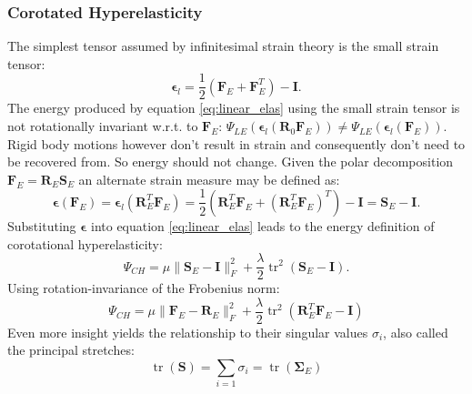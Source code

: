 \documentclass[m,times]{cgMA}
\begin{document}
\subsubsection{Corotated Hyperelasticity}\label{sec:cor_hyper}
The simplest tensor assumed by infinitesimal strain theory is the small strain tensor: \begin{equation}
  \boldsymbol{\epsilon}_l = \frac { 1 } { 2 } \left( \boldsymbol { F }_E + \boldsymbol { F }_E ^ { T } \right) - \boldsymbol { I }.
\end{equation}
The energy produced by equation \ref{eq:linear_elas} using the small strain tensor is not rotationally invariant w.r.t. to $\boldsymbol{F}_E$: $\Psi_{LE}(\boldsymbol{\epsilon}_l(\boldsymbol{R}_{0} \boldsymbol{F}_E)) \neq \Psi_{LE}(\boldsymbol{\epsilon}_l(\boldsymbol{F}_E))$. Rigid body motions however don't result in strain and consequently don't need to be recovered from. So energy should not change. Given the polar decomposition $\boldsymbol{F}_E = \boldsymbol{R}_E\boldsymbol{S}_E$ an alternate strain measure may be defined as:
\begin{equation}
 \boldsymbol { \epsilon } \left( \boldsymbol { F }_E \right) = \boldsymbol { \epsilon }_l \left( \boldsymbol { R }_E ^ { T } \boldsymbol { F }_E \right) = \frac { 1 } { 2 } \left( \boldsymbol { R }_E ^ { T } \boldsymbol { F }_E + \left( \boldsymbol { R }_E ^ { T } \boldsymbol { F }_E \right) ^ { T } \right) - \boldsymbol { I } = \boldsymbol { S }_E - \boldsymbol { I }.
\end{equation}
Substituting $ {\boldsymbol{\epsilon}}$ into equation \ref{eq:linear_elas} leads to the energy definition of corotational hyperelasticity:
\begin{equation}\label{eq:corot_S}
  \Psi_{CH} = \mu \| \boldsymbol{ S }_E - \boldsymbol { I } \| _ { F } ^ { 2 } + \frac { \lambda } { 2 } \operatorname { tr } ^ { 2 } ( \boldsymbol { S }_E - \boldsymbol { I } ).
\end{equation}
Using rotation-invariance of the Frobenius norm:
\begin{equation}
  \Psi_{CH} = \mu \| \boldsymbol {F}_E  - \boldsymbol {R}_E \| _ { F } ^ { 2 } + \frac { \lambda } { 2 } \operatorname { tr } ^ { 2 } \left( \boldsymbol { R }_E ^ { T } \boldsymbol { F }_E - \boldsymbol { I } \right)
\end{equation}
Even more insight yields the relationship to their singular values $\sigma _ i$, also called the principal stretches:
$$\operatorname {tr}\left(\boldsymbol{S}\right) = \sum _ { i = 1 } \sigma _ { i } = \operatorname{tr}\left(\boldsymbol{\Sigma}_E\right)$$
\end{document}
